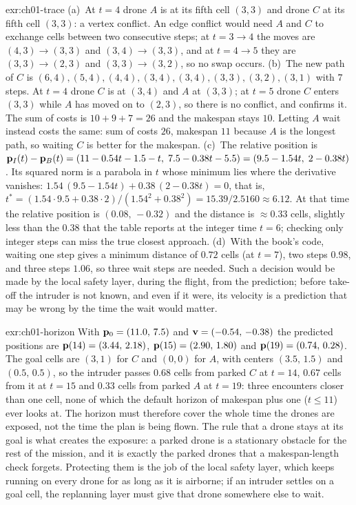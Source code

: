 \begin{solution}{exr:ch01-trace}
(a)~At $t=4$ drone $A$ is at its fifth cell $(3,3)$ and drone $C$ at its fifth cell
$(3,3)$: a vertex conflict. An edge conflict would need $A$ and $C$ to exchange cells
between two consecutive steps; at $t=3\to 4$ the moves are $(4,3)\to(3,3)$ and
$(3,4)\to(3,3)$, and at $t=4\to 5$ they are $(3,3)\to(2,3)$ and $(3,3)\to(3,2)$, so
no swap occurs. (b)~The new path of $C$ is
$(6,4),(5,4),(4,4),(3,4),(3,4),(3,3),(3,2),(3,1)$ with $7$ steps. At $t=4$ drone $C$
is at $(3,4)$ and $A$ at $(3,3)$; at $t=5$ drone $C$ enters $(3,3)$ while $A$ has moved
on to $(2,3)$, so there is no conflict, and  confirms it. The sum
of costs is $10+9+7=26$ and the makespan stays $10$. Letting $A$ wait instead costs
the same: sum of costs $26$, makespan $11$ because $A$ is the longest path, so waiting
$C$ is better for the makespan. (c)~The relative position is
$\mathbf{p}_I(t)-\mathbf{p}_B(t)=(11-0.54t-1.5-t,\;7.5-0.38t-5.5)=(9.5-1.54t,\;2-0.38t)$. Its
squared norm is a parabola in $t$ whose minimum lies where the derivative vanishes:
$1.54\,(9.5-1.54t)+0.38\,(2-0.38t)=0$, that is,
$t^*=(1.54\cdot 9.5+0.38\cdot 2)/(1.54^2+0.38^2)=15.39/2.5160\approx 6.12$. At that
time the relative position is $(0.08,\,-0.32)$ and the distance is $\approx 0.33$
cells, slightly less than the $0.38$ that the table reports at the integer time
$t=6$; checking only integer steps can miss the true closest approach.
(d)~With the book's code, waiting one step gives a minimum distance of $0.72$ cells
(at $t=7$), two steps $0.98$, and three steps $1.06$, so three wait steps are needed.
Such a decision would be made by the local safety layer, during the flight, from the
prediction; before take-off the intruder is not known, and even if it were, its
velocity is a prediction that may be wrong by the time the wait would matter.
\end{solution}

\begin{solution}{exr:ch01-horizon}
With $\mathbf{p}_0=(11.0,\,7.5)$ and $\mathbf{v}=(-0.54,\,-0.38)$ the predicted positions are
$\mathbf{p}(14)=(3.44,\,2.18)$, $\mathbf{p}(15)=(2.90,\,1.80)$ and $\mathbf{p}(19)=(0.74,\,0.28)$. The
goal cells are $(3,1)$ for $C$ and $(0,0)$ for $A$, with centers $(3.5,\,1.5)$ and
$(0.5,\,0.5)$, so the intruder passes $0.68$ cells from parked $C$ at $t=14$, $0.67$
cells from it at $t=15$ and $0.33$ cells from parked $A$ at $t=19$: three encounters
closer than one cell, none of which the default horizon of makespan plus one
($t\le 11$) ever looks at. The horizon must therefore cover the whole time the drones
are exposed, not the time the plan is being flown. The rule that a drone stays at its
goal is what creates the exposure: a parked drone is a stationary obstacle for the
rest of the mission, and it is exactly the parked drones that a makespan-length check
forgets. Protecting them is the job of the local safety layer, which keeps running on
every drone for as long as it is airborne; if an intruder settles on a goal cell, the
replanning layer must give that drone somewhere else to wait.
\end{solution}

